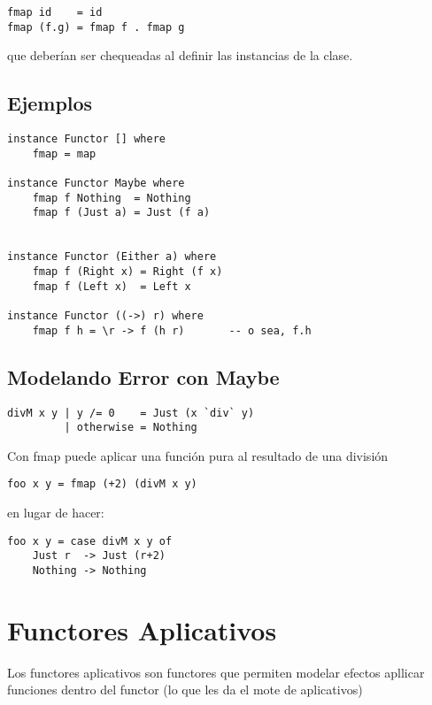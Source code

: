 \documentclass{article}
\newcommand{\imp}[1]{\textcolor{color1}{#1}}
\begin{document}
\begin{itemize}
\begin{lstlisting}
fmap id    = id
fmap (f.g) = fmap f . fmap g
\end{lstlisting}
que deberían ser chequeadas al definir las instancias de la clase.

\newpage

\subsection{Ejemplos}

\begin{lstlisting}
instance Functor [] where
    fmap = map

instance Functor Maybe where
    fmap f Nothing  = Nothing
    fmap f (Just a) = Just (f a)
    
    
instance Functor (Either a) where
    fmap f (Right x) = Right (f x)
    fmap f (Left x)  = Left x
    
instance Functor ((->) r) where
    fmap f h = \r -> f (h r)       -- o sea, f.h
\end{lstlisting}

\subsection{Modelando Error con Maybe}\label{subsec:modelando_error_con_maybe}

\begin{lstlisting}
divM x y | y /= 0    = Just (x `div` y)
         | otherwise = Nothing
\end{lstlisting}

Con fmap puede aplicar una función pura al resultado de una división

\begin{lstlisting}
foo x y = fmap (+2) (divM x y)
\end{lstlisting}

en lugar de hacer:

\begin{lstlisting}
foo x y = case divM x y of
    Just r  -> Just (r+2)
    Nothing -> Nothing
\end{lstlisting}

\section{Functores Aplicativos}\label{sec:functores_aplicativos}

\noindent Los \imp{functores aplicativos} son functores que permiten modelar efectos  apllicar funciones dentro del functor (lo que les da el mote de aplicativos)


\end{itemize}
\end{document}
